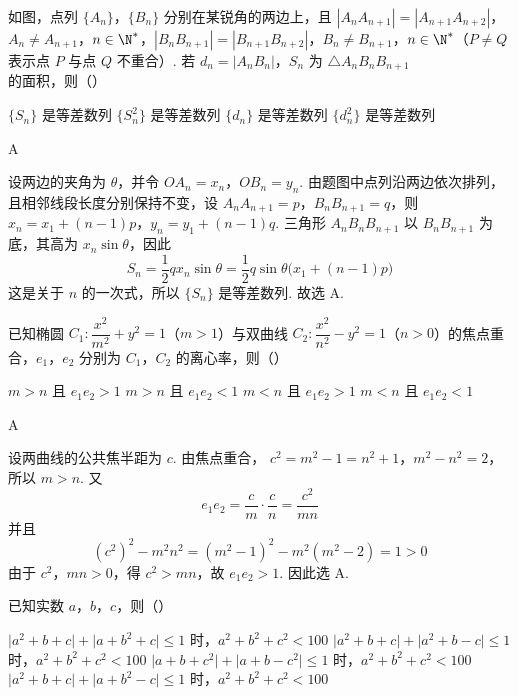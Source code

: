 \begin{problem}
如图，点列 \( \{A_n\}\)，\( \{B_n\} \) 分别在某锐角的两边上，且 \( |A_nA_{n+1}|=|A_{n+1}A_{n+2}| \)，\( A_n\ne A_{n+1} \)，\( n\in\N^* \)，\( |B_nB_{n+1}|=|B_{n+1}B_{n+2}| \)，\( B_n\ne B_{n+1} \)，\( n\in\N^* \)（\( P\ne Q \) 表示点 \(P\) 与点 \(Q\) 不重合）. 若 \( d_n=|A_nB_n| \)，\( S_n \) 为 \( \triangle A_nB_nB_{n+1} \) 的面积，则（\quad）


\choices
    {\(\{S_n\}\) 是等差数列}
    {\(\{S_n^2\}\) 是等差数列}
    {\(\{d_n\}\) 是等差数列}
    {\(\{d_n^2\}\) 是等差数列}
\end{problem}

\begin{answer}
A
\end{answer}

\begin{solution}
设两边的夹角为 \(\theta\)，并令 \(OA_n=x_n\)，\(OB_n=y_n\). 由题图中点列沿两边依次排列，且相邻线段长度分别保持不变，设
\(A_nA_{n+1}=p\)，\(B_nB_{n+1}=q\)，则
\(x_n=x_1+(n-1)p\)，\(y_n=y_1+(n-1)q\).
三角形 \(A_nB_nB_{n+1}\) 以 \(B_nB_{n+1}\) 为底，其高为 \(x_n\sin\theta\)，因此
\[
S_n=\frac12q x_n\sin\theta
 =\frac12q\sin\theta\bigl(x_1+(n-1)p\bigr)
\]
这是关于 \(n\) 的一次式，所以 \(\{S_n\}\) 是等差数列. 故选 A.
\end{solution}

\begin{problem}
已知椭圆 \( C_1:\dfrac{x^2}{m^2}+y^2=1 \)（\( m>1 \)）与双曲线 \( C_2:\dfrac{x^2}{n^2}-y^2=1 \)（\( n>0 \)）的焦点重合，\(e_1\)，\(e_2\) 分别为 \(C_1\)，\(C_2\) 的离心率，则（\quad）

\choices
    {\(m>n\) 且 \( e_1e_2>1 \)}
    {\(m>n\) 且 \( e_1e_2<1 \)}
    {\(m<n\) 且 \( e_1e_2>1 \)}
    {\(m<n\) 且 \( e_1e_2<1 \)}
\end{problem}

\begin{answer}
A
\end{answer}

\begin{solution}
设两曲线的公共焦半距为 \(c\). 由焦点重合，
\(c^2=m^2-1=n^2+1\)，\(m^2-n^2=2\)，
所以 \(m>n\). 又
\[
e_1e_2=\frac{c}{m}\cdot\frac{c}{n}=\frac{c^2}{mn}
\]
并且
\[
(c^2)^2-m^2n^2=(m^2-1)^2-m^2(m^2-2)=1>0
\]
由于 \(c^2\)，\(mn>0\)，得 \(c^2>mn\)，故 \(e_1e_2>1\). 因此选 A.
\end{solution}

\begin{problem}
已知实数 \(a\)，\(b\)，\(c\)，则（\quad）

\choices
    {\(\bigl|a^2+b+c\bigr|+\bigl|a+b^2+c\bigr|\le 1\) 时，\( a^2+b^2+c^2<100 \)}
    {\(\bigl|a^2+b+c\bigr|+\bigl|a^2+b-c\bigr|\le 1\) 时，\( a^2+b^2+c^2<100 \)}
    {\(\bigl|a+b+c^2\bigr|+\bigl|a+b-c^2\bigr|\le 1\) 时，\( a^2+b^2+c^2<100 \)}
    {\(\bigl|a^2+b+c\bigr|+\bigl|a+b^2-c\bigr|\le 1\) 时，\( a^2+b^2+c^2<100 \)}
\end{problem}

